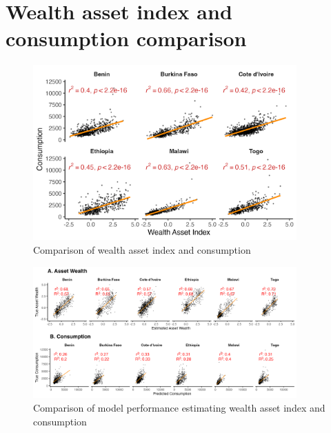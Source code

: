 \documentclass{article}
\begin{document}
\newpage
\section{Wealth asset index and consumption comparison}
\label{si:asset_vs_consumption}

\begin{figure}[H]
    \centering
    \includegraphics[width=0.9\textwidth]{figures/lsms_pov_measure_cor.png}
    \caption{Comparison of wealth asset index and consumption}
     \label{fig:lsms_pov_measure_cor}
\end{figure}

\begin{figure}[H]
    \centering
    \includegraphics[width=0.9\textwidth]{figures/lsms_r2.png}
    \caption{Comparison of model performance estimating wealth asset index and consumption}
     \label{fig:lsms_r2}
\end{figure}
\end{document}
